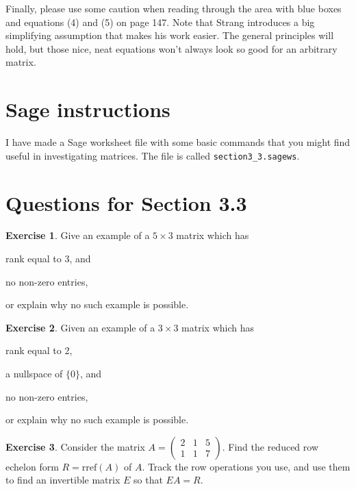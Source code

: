 \documentclass[11pt]{amsart}
\theoremstyle{definition}
\newtheorem{exercise}{Exercise}
\begin{document}
Finally, please use some caution when reading through the area with blue boxes and equations (4) and (5) on page 147. Note that Strang introduces a big simplifying assumption that makes his work easier. The general principles will hold, but those nice, neat equations won't always look so good for an arbitrary matrix.


\section{Sage instructions}

I have made a Sage worksheet file with some basic commands that you might find useful in investigating matrices. The file is called \texttt{section3\_3.sagews}.


\section{Questions for Section 3.3}
\setcounter{exercise}{89}

\begin{exercise}
Give an example of a $5 \times 3$ matrix which has
\begin{compactitem}
\item rank equal to 3, and
\item no non-zero entries,
\end{compactitem}
or explain why no such example is possible.
\end{exercise}

\begin{exercise}
Given an example of a $3 \times 3$ matrix which has
\begin{compactitem}
\item rank equal to 2,
\item a nullspace of $\{0\}$, and
\item no non-zero entries,
\end{compactitem}
or explain why no such example is possible.
\end{exercise}


\begin{exercise}
Consider the matrix $A = \left( \begin{smallmatrix} 2 & 1 & 5 \\ 1 & 1 & 7 \end{smallmatrix}\right)$. Find the reduced row echelon form $R = \mathrm{rref}(A)$ of $A$. Track the row operations you use, and use them to find an invertible matrix $E$ so that $EA = R$.
\end{exercise}
\end{document}
